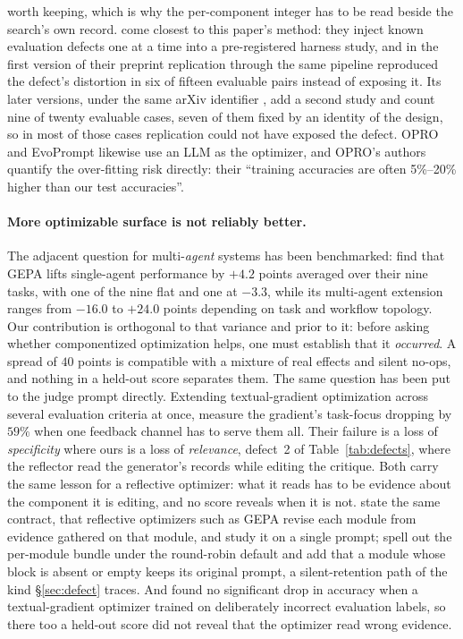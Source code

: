 \documentclass[11pt]{article}
\begin{document}
worth keeping, which is why the per-component integer has to be read beside the search's own
record. \citet{xu2026harnessrepair} come closest to this paper's method: they inject known
evaluation defects one at a time into a pre-registered harness study, and in the first version of
their preprint replication through the same pipeline reproduced the defect's distortion in six of
fifteen evaluable pairs instead of exposing it. Its later versions, under the same arXiv
identifier \citep{xu2026harnessrepairv3}, add a second study and count nine of twenty evaluable cases, seven of them fixed by an
identity of the design, so in most of those cases replication could not have exposed the defect. OPRO \citep{yang2023opro} and EvoPrompt \citep{guo2024evoprompt} likewise use an
LLM as the optimizer, and OPRO's authors quantify the over-fitting risk directly: their
``training accuracies are often 5\%--20\% higher than our test accuracies''.

\paragraph{More optimizable surface is not reliably better.}
The adjacent question for multi-\emph{agent} systems has been benchmarked:
\citet{bai2026masprompt} find that GEPA lifts single-agent performance by $+4.2$ points
averaged over their nine tasks, with one of the nine flat and one at $-3.3$, while its
multi-agent extension ranges from $-16.0$ to
$+24.0$ points depending on task and workflow topology. Our contribution is orthogonal to that
variance and prior to it: before asking whether componentized optimization helps, one must
establish that it \emph{occurred}. A spread of $40$ points is compatible with a
mixture of real effects and silent no-ops, and nothing in a held-out score separates them.
The same question has been put to the judge prompt directly. Extending textual-gradient
optimization across several evaluation criteria at once, \citet{darshan2026gradients} measure the
gradient's task-focus dropping by $59\%$ when one feedback channel has to serve them all. Their
failure is a loss of \emph{specificity} where ours is a loss of \emph{relevance}, defect~2 of
Table~\ref{tab:defects}, where the reflector read the generator's records while editing the
critique. Both carry the same lesson for a reflective optimizer: what it reads has to be evidence
about the component it is editing, and no score reveals when it is not.
\citet{zhou2026reflector} state the same contract, that reflective optimizers such as GEPA revise
each module from evidence gathered on that module, and study it on a single prompt;
\citet{yuan2026forge} spell out the per-module bundle under the round-robin default and add that a
module whose block is absent or empty keeps its original prompt, a silent-retention path of the
kind \S\ref{sec:defect} traces. And \citet{melcer2025textualgradients} found no significant drop in
accuracy when a textual-gradient optimizer trained on deliberately incorrect evaluation labels, so
there too a held-out score did not reveal that the optimizer read wrong evidence.
\end{document}
